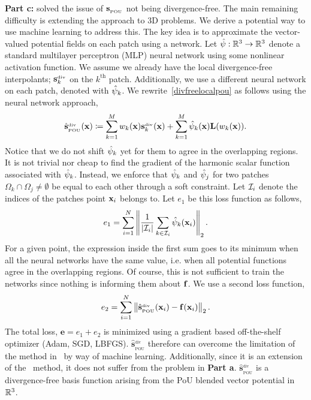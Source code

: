 {\bf Part c:} \citep{drake2021partition} solved the issue of $\mathbf{s}_{_{\text{POU}}}$ not being divergence-free. The main remaining difficulty is extending the approach to 3D problems. We derive a potential way to use machine learning to address this. The key idea is to approximate the vector-valued potential fields on each patch using a network. Let $\hat{\psi}: \mathbb{R}^{3} \rightarrow \mathbb{R}^{3}$ denote a standard multilayer perceptron (MLP) neural network using some nonlinear activation function. We assume we already have the local divergence-free interpolants; $\mathbf{s}_k^{_{\text{div}}}$ on the $k^{\text{th}}$ patch. Additionally, we use a different neural network on each patch, denoted with $\hat{\psi}_k$. We rewrite~\eqref{divfreelocalpou} as follows using the neural network approach,
\begin{align}
\hat{\mathbf{s}}^{_{\text{div}}}_{_{\text{POU}}}(\mathbf{x}) \coloneqq \sum\limits_{k=1}^{M} w_k(\mathbf{x}) \mathbf{s}_k^{_{\text{div}}}(\mathbf{x}) + \sum\limits_{k=1}^{M} \hat{\psi}_k(\mathbf{x}) \mathbf{L}(w_k(\mathbf{x})). \label{divfreelocalpou_nn}
\end{align}
Notice that we do not shift $\hat{\psi}_k$ yet for them to agree in the overlapping regions. It is not trivial nor cheap to find the gradient of the harmonic scalar function associated with $\hat{\psi}_k$. Instead, we enforce that $\hat{\psi}_k$ and $\hat{\psi}_j$ for two patches $\Omega_k \cap \Omega_j \neq \emptyset$ be equal to each other through a soft constraint. Let $\mathcal{I}_i$ denote the indices of the patches point $\mathbf{x}_i$ belongs to. Let $e_1$ be this loss function as follows,
\begin{align}
e_1 = \sum\limits_{i=1}^{N} \left\| \frac{1}{|\mathcal{I}_i|} \sum\limits_{k \in \mathcal{I}_i} \hat{\psi}_k(\mathbf{x}_i) \right\|_2.
\end{align}
For a given point, the expression inside the first sum goes to its minimum when all the neural networks have the same value, i.e. when all potential functions agree in the overlapping regions. Of course, this is not sufficient to train the networks since nothing is informing them about $\mathbf{f}$. We use a second loss function,
\begin{align}
e_2 = \sum\limits_{i=1}^{N} \left\| \hat{\mathbf{s}}^{_{\text{div}}}_{_{\text{POU}}}(\mathbf{x}_i) - \mathbf{f}(\mathbf{x}_i) \right\|_2.
\end{align}
The total loss, $\mathbf{e} = e_1 + e_2$ is minimized using a gradient based off-the-shelf optimizer (Adam, SGD, LBFGS). $\hat{\mathbf{s}}^{_{\text{div}}}_{_{\text{POU}}}$ therefore can overcome the limitation of the method in~\citep{drake2021partition} by way of machine learning. Additionally, since it is an extension of the~\citep{drake2021partition} method, it does not suffer from the problem in {\bf Part a}. $\hat{\mathbf{s}}^{_{\text{div}}}_{_{\text{POU}}}$ is a divergence-free basis function arising from the PoU blended vector potential in $\mathbb{R}^3$.

